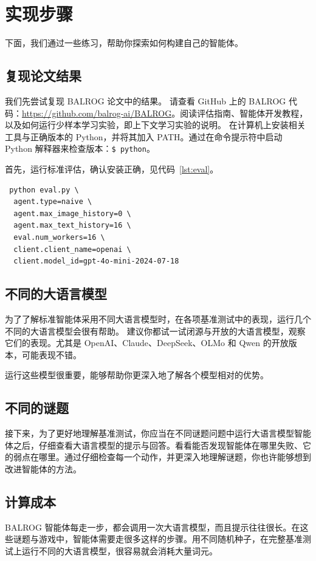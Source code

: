 \section{实现步骤}
下面，我们通过一些练习，帮助你探索如何构建自己的智能体。
\subsection{复现论文结果}

我们先尝试复现 BALROG 论文中的结果。
请查看 GitHub 上的 BALROG 代码：\url{https://github.com/balrog-ai/BALROG}。阅读评估指南、智能体开发教程，以及如何运行少样本学习实验，即上下文学习实验的说明。
在计算机上安装相关工具与正确版本的 Python，并将其加入 PATH。通过在命令提示符中启动 Python 解释器来检查版本：\verb|$ python|。

首先，运行标准评估，确认安装正确，见代码~\ref{lst:eval}。
\begin{listing}
    \begin{verbatim}
 python eval.py \
  agent.type=naive \
  agent.max_image_history=0 \
  agent.max_text_history=16 \
  eval.num_workers=16 \
  client.client_name=openai \
  client.model_id=gpt-4o-mini-2024-07-18       
    \end{verbatim}
    \caption{运行标准评估。}\label{lst:eval}
\end{listing}

\subsection{不同的大语言模型}

为了了解标准智能体采用不同大语言模型时，在各项基准测试中的表现，运行几个不同的大语言模型会很有帮助。
建议你都试一试闭源与开放的大语言模型，观察它们的表现。尤其是 OpenAI、Claude、DeepSeek、OLMo 和 Qwen 的开放版本，可能表现不错。

运行这些模型很重要，能够帮助你更深入地了解各个模型相对的优势。

\subsection{不同的谜题}
接下来，为了更好地理解基准测试，你应当在不同谜题问题中运行大语言模型智能体之后，仔细查看大语言模型的提示与回答。看看能否发现智能体在哪里失败、它的弱点在哪里。通过仔细检查每一个动作，并更深入地理解谜题，你也许能够想到改进智能体的方法。

\subsection{计算成本}
BALROG 智能体每走一步，都会调用一次大语言模型，而且提示往往很长。在这些谜题与游戏中，智能体需要走很多这样的步骤。用不同随机种子，在完整基准测试上运行不同的大语言模型，很容易就会消耗大量词元。

